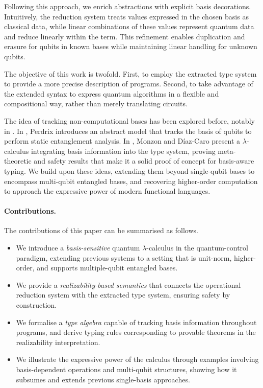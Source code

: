 \documentclass[runningheads,orivec,envcountsame,envcountsect]{llncs}
\begin{document}
Following this approach, we enrich abstractions with explicit basis
decorations. Intuitively, the reduction system treats values expressed in the
chosen basis as classical data, while linear combinations of these values
represent quantum data and reduce linearly within the term. This refinement
enables duplication and erasure for qubits in known bases while maintaining
linear handling for unknown qubits.

The objective of this work is twofold. First, to employ the extracted type
system to provide a more precise description of programs. Second, to take
advantage of the extended syntax to express quantum algorithms in a flexible
and compositional way, rather than merely translating circuits.

The idea of tracking non-computational bases has been explored before, notably
in \cite{Perdrix2008,DiazcaroMonzonAPLAS25}. In \cite{Perdrix2008}, Perdrix
introduces an abstract model that tracks the basis of qubits to perform static
entanglement analysis. In \cite{DiazcaroMonzonAPLAS25}, Monzon and Díaz-Caro
present a $\lambda$-calculus integrating basis information into the type system,
proving meta-theoretic and safety results that make it a solid proof of concept
for basis-aware typing. We build upon these ideas, extending them beyond
single-qubit bases to encompass multi-qubit entangled bases, and recovering
higher-order computation to approach the expressive power of modern functional
languages.

\paragraph{Contributions.}
The contributions of this paper can be summarised as follows.
\begin{itemize}
  \item We introduce a \emph{basis-sensitive} quantum $\lambda$-calculus in the
  quantum-control paradigm, extending previous systems to a setting that is
  unit-norm, higher-order, and supports multiple-qubit entangled bases.
  \item We provide a \emph{realizability-based semantics} that connects the
  operational reduction system with the extracted type system, ensuring safety
  by construction.
  \item We formalise a \emph{type algebra} capable of tracking basis
  information throughout programs, and derive typing rules corresponding to
  provable theorems in the realizability interpretation.
  \item We illustrate the expressive power of the calculus through examples
  involving basis-dependent operations and multi-qubit structures, showing how
  it subsumes and extends previous single-basis approaches.
\end{itemize}
\end{document}

